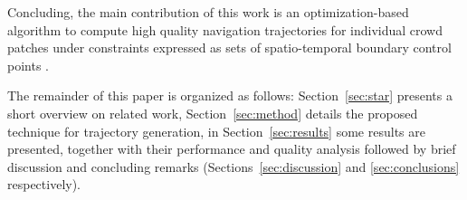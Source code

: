 Concluding, the main contribution of this work is an optimization-based algorithm to compute high quality navigation trajectories  for individual crowd patches under constraints expressed as sets of spatio-temporal boundary control points	.

The remainder of this paper is organized as follows: Section~\ref{sec:star} presents a short overview on related work, Section~\ref{sec:method} details the proposed technique for trajectory generation, in Section~\ref{sec:results} some results are presented, together with their performance and quality analysis followed by brief discussion and concluding remarks (Sections~\ref{sec:discussion} and \ref{sec:conclusions} respectively). 

